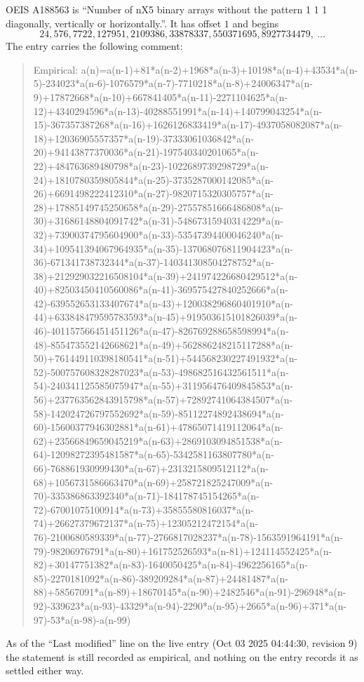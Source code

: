\documentclass[11pt,a4paper]{article}
\theoremstyle{plain}
\theoremstyle{definition}
\begin{document}
OEIS A188563 is ``Number of nX5 binary arrays without the pattern 1 1 1 diagonally, vertically or horizontally.''. It has offset $1$ and begins
\[
24, 576, 7722, 127951, 2109386, 33878337, 550371695, 8927734479,\ \dots
\]
The entry carries the following comment:
\begin{quote}\small
Empirical: a(n)=a(n-1)+81*a(n-2)+1968*a(n-3)+10198*a(n-4)+43534*a(n-5)-234023*a(n-6)-1076579*a(n-7)-7710218*a(n-8)+24006347*a(n-9)+17872668*a(n-10)+667841405*a(n-11)-2271104625*a(n-12)+4340294596*a(n-13)-40288551991*a(n-14)+140799043254*a(n-15)-367357387268*a(n-16)+1626126833419*a(n-17)-4937058082087*a(n-18)+12036905557357*a(n-19)-37333061036842*a(n-20)+94143877370036*a(n-21)-197540340201065*a(n-22)+484763689480798*a(n-23)-1022689739298729*a(n-24)+1810780359805844*a(n-25)-3735287000142085*a(n-26)+6691498222412310*a(n-27)-9820715320305757*a(n-28)+17885149745250658*a(n-29)-27557851666486808*a(n-30)+31686148804091742*a(n-31)-54867315940314229*a(n-32)+73900374795604900*a(n-33)-53547394400046240*a(n-34)+109541394067964935*a(n-35)-137068076811904423*a(n-36)-671341738732344*a(n-37)-140341308504278752*a(n-38)+212929032216508104*a(n-39)+241974226680429512*a(n-40)+82503450410560086*a(n-41)-369575427840252666*a(n-42)-639552653133407674*a(n-43)+120038296860401910*a(n-44)+633848479595783593*a(n-45)+919503615101826039*a(n-46)-401157566451451126*a(n-47)-826769288658598994*a(n-48)-855473552142668621*a(n-49)+562886248215117288*a(n-50)+761449110398180541*a(n-51)+544568230227491932*a(n-52)-500757608328287023*a(n-53)-498682516432561511*a(n-54)-240341125585075947*a(n-55)+311956476409845853*a(n-56)+237763562843915798*a(n-57)+72892741064384507*a(n-58)-142024726797552692*a(n-59)-85112274892438694*a(n-60)-15600377946302881*a(n-61)+47865071419112064*a(n-62)+23566849659045219*a(n-63)+2869103094851538*a(n-64)-12098272395481587*a(n-65)-5342581163807780*a(n-66)-768861930999430*a(n-67)+2313215809512112*a(n-68)+1056731586663470*a(n-69)+258721825247009*a(n-70)-335386863392340*a(n-71)-184178745154265*a(n-72)-67001075100914*a(n-73)+35855580816037*a(n-74)+26627379672137*a(n-75)+12305212472154*a(n-76)-2100680589339*a(n-77)-2766817028237*a(n-78)-1563591964191*a(n-79)-98206976791*a(n-80)+161752526593*a(n-81)+124114552425*a(n-82)+30147751382*a(n-83)-1640050425*a(n-84)-4962256165*a(n-85)-2270181092*a(n-86)-389209284*a(n-87)+24481487*a(n-88)+58567091*a(n-89)+18670145*a(n-90)+2482546*a(n-91)-296948*a(n-92)-339623*a(n-93)-43329*a(n-94)-2290*a(n-95)+2665*a(n-96)+371*a(n-97)-53*a(n-98)-a(n-99)
\end{quote}
As of the ``Last modified'' line on the live entry (Oct 03 2025 04:44:30, revision 9) the statement is
still recorded as empirical, and nothing on the entry records it as settled either way.
\end{document}
